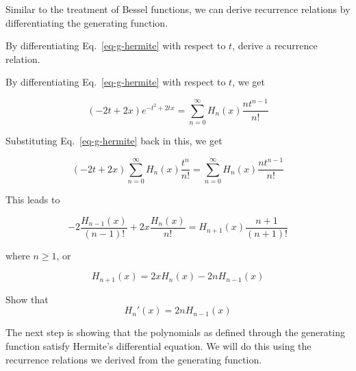 \label{week5}

Similar to the treatment of Bessel functions, we can derive recurrence relations by differentiating the generating function.

\begin{cue}
By differentiating Eq.~\ref{eq-g-hermite} with respect to $t$, derive a recurrence relation.
\end{cue}
 
By differentiating Eq.~\ref{eq-g-hermite} with respect to $t$, we get

\begin{equation}
(-2t+2x)e^{-t^2 + 2tx} = \sum_{n = 0}^{\infty} H_n(x) \frac{nt^{n-1}}{n!}
\end{equation} 

Substituting Eq.~\ref{eq-g-hermite} back in this, we get

\begin{equation}
(-2t+2x) \sum_{n = 0}^{\infty} H_n(x)\frac{t^n}{n!} = \sum_{n = 0}^{\infty} H_n(x) \frac{nt^{n-1}}{n!}
\end{equation} 

\noindent{}This leads to

\begin{equation}
-2  \frac{H_{n-1}(x)}{(n-1)!} + 2 x \frac{H_n(x)}{n!} = H_{n+1}(x) \frac{n+1}{(n+1)!}
\end{equation} 

where $n \geq 1$, or

\begin{equation}
H_{n+1}(x) = 2 x H_n(x) - 2 n H_{n-1}(x)
\label{eq-recur-hermite-1}
\end{equation} 
 

\begin{exer}
Show that
$$\displaystyle H_n'(x) = 2nH_{n-1}(x)$$ \label{eq-recur-hermite-2}
\end{exer}


\pagebreak


The next step is showing that the polynomials as defined through the generating function satisfy Hermite's differential equation. We will do this using the recurrence relations we derived from the generating function.

